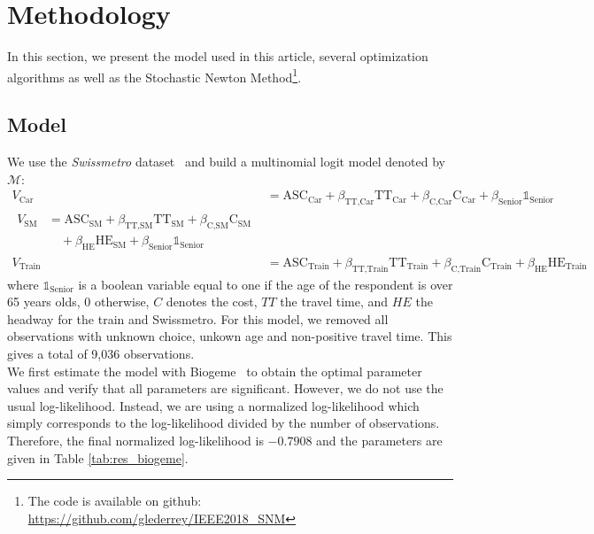 \documentclass[conference]{IEEEtran}
\begin{document}
\vspace{-0.2cm}
\section{Methodology}
\label{sec:methodo}

In this section, we present the model used in this article, several optimization algorithms as well as the Stochastic Newton Method\footnote{The code is available on github: \href{https://github.com/glederrey/IEEE2018\_SNM}{https://github.com/glederrey/IEEE2018\_SNM}}.

\subsection{Model}
\label{sec:model}

We use the {\it Swissmetro} dataset~\cite{bierlaire_acceptance_2001} and build a multinomial logit model denoted by $\mathcal{M}$:
\begin{align}
\label{eq:model}
V_{\text{Car}} &= \text{ASC}_{\text{Car}} + \beta_{\text{TT,Car}} \text{TT}_{\text{Car}} + \beta_{\text{C,Car}} \text{C}_{\text{Car}} + \beta_{\text{Senior}}\mathbb{1}_{\text{Senior}} \nonumber \\
\begin{split}
V_{\text{SM}} &= \text{ASC}_{\text{SM}} + \beta_{\text{TT,SM}} \text{TT}_{\text{SM}} + \beta_{\text{C,SM}} \text{C}_{\text{SM}} \\
& \quad + \beta_{\text{HE}} \text{HE}_{\text{SM}} + \beta_{\text{Senior}}\mathbb{1}_{\text{Senior}}
\end{split} \\
V_{\text{Train}} &= \text{ASC}_{\text{Train}} + \beta_{\text{TT,Train}} \text{TT}_{\text{Train}} + \beta_{\text{C,Train}} \text{C}_{\text{Train}} + \beta_{\text{HE}} \text{HE}_{\text{Train}} \nonumber
\end{align}
where $\mathbb{1}_{\text{Senior}}$ is a boolean variable equal to one if the age of the respondent is over 65 years olds, 0 otherwise, $C$ denotes the cost, $TT$ the travel time, and $HE$ the headway for the train and Swissmetro. For this model, we removed all observations with unknown choice, unkown age and non-positive travel time. This gives a total of 9,036 observations.\\
 
We first estimate the model with Biogeme~\cite{bierlaire_biogeme:_2003} to obtain the optimal parameter values and verify that all parameters are significant. However, we do not use the usual log-likelihood. Instead, we are using a normalized log-likelihood which simply corresponds to the log-likelihood divided by the number of observations. Therefore, the final normalized log-likelihood is $-0.7908$ and the parameters are given in Table \ref{tab:res_biogeme}.\\
\end{document}
